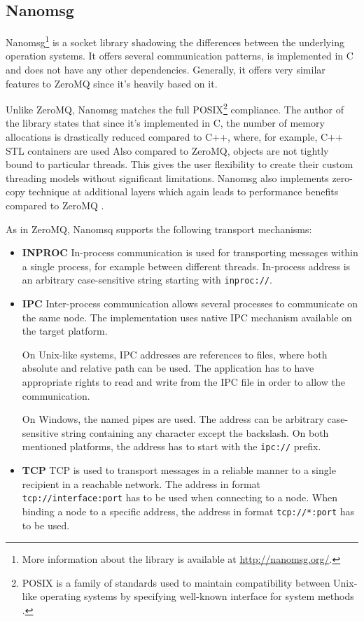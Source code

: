 \subsection{Nanomsg}
\label{nanomsg}
Nanomsg\footnote{More information about the library is available at \url{http://nanomsg.org/}.} is a socket library shadowing the differences between the underlying operation systems. It offers several communication patterns, is implemented in C and does not have any other dependencies. Generally, it offers very similar features to ZeroMQ since it's heavily based on it.

Unlike ZeroMQ, Nanomsg matches the full POSIX\footnote{POSIX is a family of standards used to maintain compatibility between Unix-like operating systems by specifying well-known interface for system methods \cite{POSIX}. } compliance. The author of the library states that since it's implemented in C, the number of memory allocations is drastically reduced compared to C++, where, for example, C++ STL containers are used  Also compared to ZeroMQ, objects are not tightly bound to particular threads. This gives the user flexibility to create their custom threading models without significant limitations. Nanomsg also implements zero-copy technique at additional layers which again leads to performance benefits compared to ZeroMQ \cite{Nanomsg_Diff}.

As in ZeroMQ, Nanomsq supports the following transport mechanisms:
\begin{itemize}
	\item \textbf{INPROC} \newline
	In-process communication is used for transporting messages within a single process, for example between different threads. In-process address is an arbitrary case-sensitive string starting with \texttt{inproc://}.
	\item \textbf{IPC}  \newline 
	Inter-process communication allows several processes to communicate on the same node. The implementation uses native IPC mechanism available on the target platform. 
	
	On Unix-like systems, IPC addresses are references to files, where both absolute and relative path can be used. The application has to have appropriate rights to read and write from the IPC file in order to allow the communication.
	
	 On Windows, the named pipes are used. The address can be arbitrary case-sensitive string containing any character except the backslash. On both mentioned platforms, the address has to start with the \texttt{ipc://} prefix.
	\item \textbf{TCP} \newline
	TCP is used to transport messages in a reliable manner to a single recipient in a reachable network. The address in format \texttt{tcp://interface:port} has to be used when connecting to a node. When binding a node to a specific address, the address in format \texttt{tcp://*:port} has to be used.
\end{itemize}

